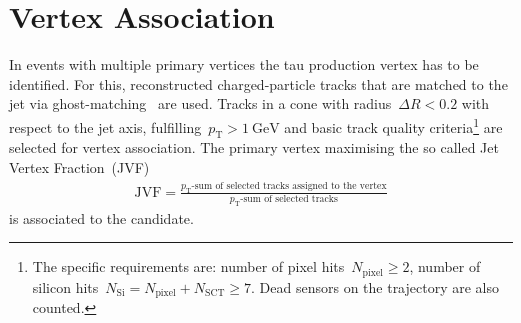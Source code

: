 \section{Vertex Association}
\label{sec:reco_vertex_assoc}
%
%
In events with multiple primary vertices the tau production vertex has to be
identified. For this, reconstructed charged-particle tracks that are matched to
the jet via ghost-matching~\cite{ghost_matching} are used.
Tracks in a cone with radius~$\Delta R < 0.2$ with respect to the jet axis,
fulfilling~$p_\text{T} > \SI{1}{\GeV}$ and basic track quality
criteria\footnote{The specific requirements are: number of pixel
  hits~$N_\text{pixel} \geq 2$, number of silicon
  hits~$N_\text{Si} = N_\text{pixel} + N_\text{SCT} \geq 7$. Dead sensors on the
  trajectory are also counted.} are selected for vertex association.
The primary vertex maximising the so called Jet Vertex Fraction~(JVF)
\begin{align*}
  \text{JVF} = \frac{p_\text{T}\text{-sum of selected tracks assigned to the vertex}}{p_\text{T}\text{-sum of selected tracks}}
\end{align*}
is associated to the \tauhadvis candidate.

